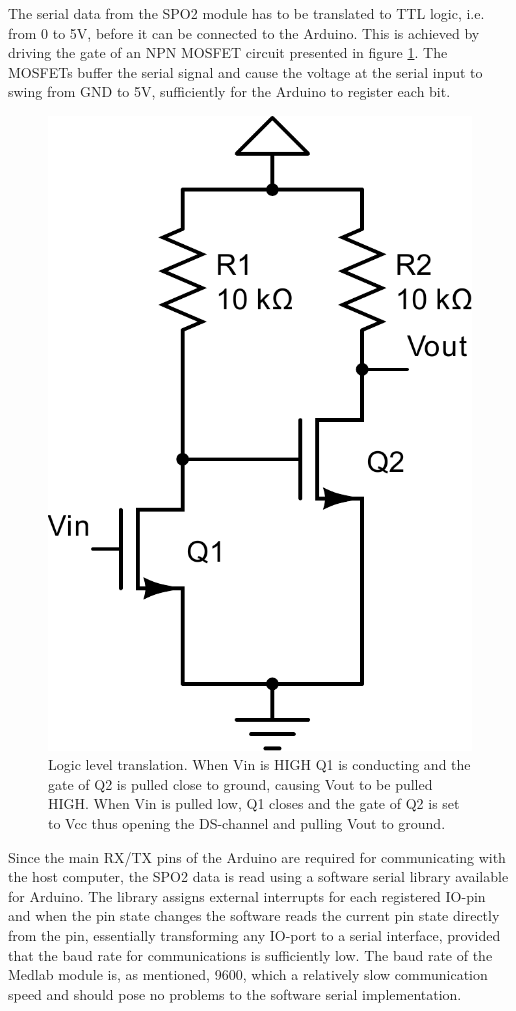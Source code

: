 \documentclass[a4paper,11pt]{article}
\begin{document}
The serial data from the SPO2 module has to be
translated to TTL logic, i.e. from 0 to 5V, before it can be connected
to the Arduino. This is achieved by driving the gate of an NPN MOSFET
circuit presented in figure \ref{fig:logic-level-translation}. The
MOSFETs buffer the serial signal and cause the voltage at the serial
input to swing from GND to 5V, sufficiently for the Arduino to
register each bit.
\begin{figure}[htb]  
  \caption{Logic level translation. When Vin is HIGH Q1 is conducting
    and the gate of Q2 is pulled close to ground, causing Vout to be
    pulled HIGH. When Vin is pulled low, Q1 closes and the gate of Q2
    is set to Vcc thus opening the DS-channel and pulling Vout to
    ground.}
  \label{fig:logic-level-translation}
  \includegraphics[width=0.5\linewidth]{level_converter}
\end{figure}

Since the main RX/TX pins of the Arduino are required for
communicating with the host computer, the SPO2 data is read using a
software serial library available for Arduino. The library assigns
external interrupts for each registered IO-pin and when the pin state
changes the software reads the current pin state directly from the
pin, essentially transforming any IO-port to a serial interface,
provided that the baud rate for communications is sufficiently low.
The baud rate of the Medlab module is, as mentioned, 9600, which a
relatively slow communication speed and should pose no problems to the
software serial implementation.
\end{document}
